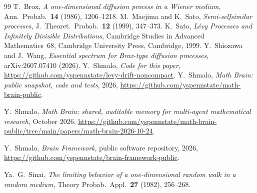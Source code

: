 \documentclass[11pt]{amsart}
\theoremstyle{remark}
\begin{document}
\begin{thebibliography}{99}
 T.~Brox, \emph{A one-dimensional diffusion process in a Wiener medium}, Ann.\ Probab.\ \textbf{14} (1986), 1206--1218.
 M.~Maejima and K.~Sato, \emph{Semi-selfsimilar processes}, J.\ Theoret.\ Probab.\ \textbf{12} (1999), 347--373.
 K.~Sato, \emph{L\'evy Processes and Infinitely Divisible Distributions}, Cambridge Studies in Advanced Mathematics~68, Cambridge University Press, Cambridge, 1999.
 Y.~Shiozawa and J.~Wang, \emph{Essential spectrum for Brox-type diffusion processes}, arXiv:2607.07410 (2026).
 Y.~Shmalo, \emph{Code for this paper}, \url{https://github.com/yspennstate/levy-drift-noncompact}.
 Y.~Shmalo, \emph{Math Brain: public snapshot, code and tests}, 2026, \url{https://github.com/yspennstate/math-brain-public}.

 Y.~Shmalo, \emph{Math Brain: shared, auditable memory for multi-agent mathematical research}, October 2026, \url{https://github.com/yspennstate/math-brain-public/tree/main/papers/math-brain-2026-10-24}.

 Y.~Shmalo, \emph{Brain Framework}, public software repository, 2026, \url{https://github.com/yspennstate/brain-framework-public}.

 Ya.~G.~Sinai, \emph{The limiting behavior of a one-dimensional random walk in a random medium}, Theory Probab.\ Appl.\ \textbf{27} (1982), 256--268.
\end{thebibliography}
\end{document}
